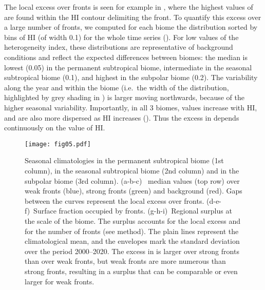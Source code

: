 The local  excess over fronts is seen for example in , where the highest values of  are found within the HI contour delimiting the front.
To quantify this excess over a large number of fronts, we computed for each biome the  distribution sorted by bins of HI (of width \num{0.1}) for the whole time series ().
For low values of the heterogeneity index, these distributions are representative of background conditions and reflect the expected differences between biomes: the median  is lowest (\qty{0.05}{\mgm}) in the permanent subtropical biome, intermediate in the seasonal subtropical biome (\qty{0.1}{\mgm}), and highest in the subpolar biome (\qty{0.2}{\mgm}).
The  variability along the year and within the biome (i.e.\ the width of the distribution, highlighted by grey shading in ) is larger moving northwards, because of the higher seasonal variability.
Importantly, in all 3 biomes,  values increase with HI, and are also more dispersed as HI increases ().
Thus the excess in  depends continuously on the value of HI.\@


\begin{figure*}
  \centering
  \texttt{[image: fig05.pdf]}
  \caption[Seasonal impact of fronts on Chl-\textit{a}]{
    Seasonal climatologies in the permanent subtropical biome (1st column), in the seasonal subtropical biome (2nd column) and in the subpolar biome (3rd column).
    (a-b-c)~ median values (top row) over weak fronts (blue), strong fronts (green) and background (red). Gaps between the curves represent the local excess over fronts.
    (d-e-f)~Surface fraction occupied by fronts.
    (g-h-i)~Regional  surplus at the scale of the biome.
    The surplus accounts for the local excess and for the number of fronts (see method).
    The plain lines represent the climatological mean, and the envelopes mark the standard deviation over the period 2000--2020.
    The excess in  is larger over strong fronts than over weak fronts, but weak fronts are more numerous than strong fronts, resulting in a  surplus that can be comparable or even larger for weak fronts.
  }%
  \label{fig:ts-climato}
\end{figure*}

